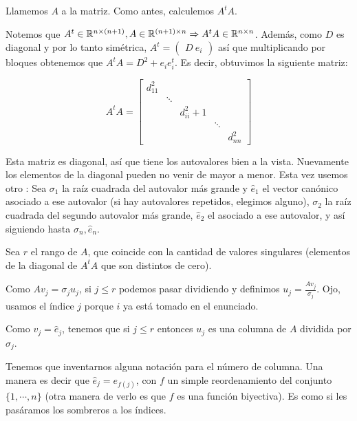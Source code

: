 \documentclass[10pt,a4paper,final]{article}
\begin{document}
Llamemos $A$ a la matriz. Como antes, calculemos $A^t A$.

Notemos que $A^t\in \mathbb{R}^{n\times (n+1)}, A\in\mathbb{R}^{(n+1)\times n} \Rightarrow A^t A \in \mathbb{R}^{n\times n}$. Además, como $D$ es diagonal y por lo tanto simétrica, $A^t = \begin{pmatrix} D\ e_i \end{pmatrix}$ así que multiplicando por bloques obtenemos que $A^t A = D^2 + e_i e_i^t$. Es decir, obtuvimos la siguiente matriz:

\[
  A^t A =
  \begin{bmatrix}
    d_{11}^2 & & \\
    & \ddots & \\
    & & d_{ii}^2 +1\\
    & & & \ddots & \\
    & & & & d_{nn}^2
  \end{bmatrix}
\]


Esta matriz es diagonal, así que tiene los autovalores bien a la vista. Nuevamente los elementos de la diagonal pueden no venir de mayor a menor. Esta vez usemos otro : Sea $\sigma_1$ la raíz cuadrada del autovalor más grande y $\hat{e}_1$ el vector canónico asociado a ese autovalor (si hay autovalores repetidos, elegimos alguno), $\sigma_2$ la raíz cuadrada del segundo autovalor más grande, $\hat{e}_2$ el asociado a ese autovalor, y así siguiendo hasta $\sigma_n, \hat{e}_n$.

Sea $r$ el rango de $A$, que coincide con la cantidad de valores singulares (elementos de la diagonal de $A^t A$ que son distintos de cero).

Como $A v_j = \sigma_j u_j$, si $j \leq r$ podemos pasar dividiendo y definimos $u_j = \frac{A v_j}{\sigma_j}$. Ojo, usamos el índice $j$ porque $i$ ya está tomado en el enunciado.

Como $v_j = \hat{e}_j$, tenemos que si $j\leq r$ entonces $u_j$ es una columna de $A$ dividida por $\sigma_j$.

Tenemos que inventarnos alguna notación para el número de columna. Una manera es decir que $\hat{e}_j = e_{f(j)}$, con $f$ un simple reordenamiento del conjunto $\{1,\cdots, n\}$ (otra manera de verlo es que $f$ es una función biyectiva). Es como si les pasáramos los sombreros a los índices.
\end{document}
